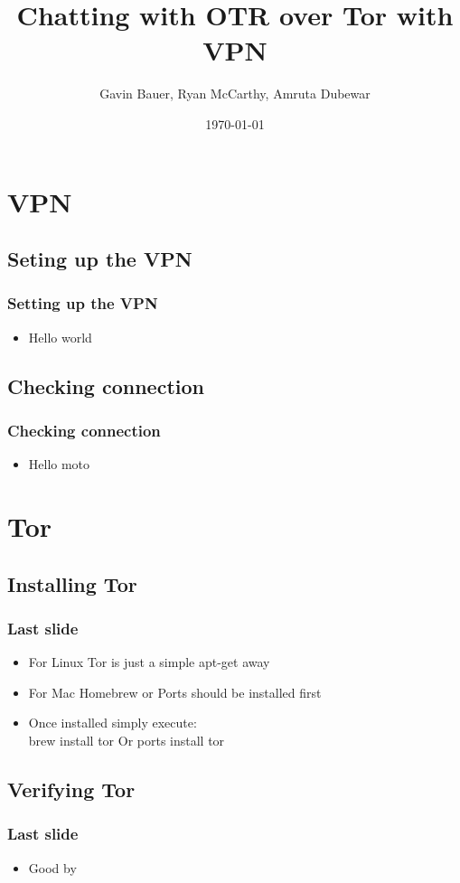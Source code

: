\documentclass{beamer}
\title{Chatting with OTR over Tor with VPN}
\author{Gavin Bauer, Ryan McCarthy, Amruta Dubewar}
\date{\today}
\begin{document}
\begin{frame}
\maketitle
\end{frame}
\section{VPN}
\subsection{Seting up the VPN}
\begin{frame}
\frametitle{Setting up the VPN}
\begin{itemize}
\item Hello world
\end{itemize}
\end{frame}
\subsection{Checking connection}
\begin{frame}
\frametitle{Checking connection}
\begin{itemize}
\item Hello moto
\end{itemize}
\end{frame}


\section{Tor}
\subsection{Installing Tor}
\begin{frame}
\frametitle{Last slide}
\begin{itemize}
\item For Linux Tor is just a simple apt-get away
\pause
\item For Mac Homebrew or Ports should be installed first
\item Once installed simply execute: \\ \alert<2>{brew install tor} Or \alert<2>{ports install tor}


\end{itemize}
\end{frame}

\subsection{Verifying Tor}
\begin{frame}
\frametitle{Last slide}
\begin{itemize}
\item Good by
\end{itemize}
\end{frame}
\end{document}

